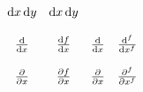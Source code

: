 \documentclass{unittest}
\begin{document}
\(\begin{array}{ccccc}
\\\\%
	\dd{x}\dd{y} & \dd{x}\dd{y}
\\\\%
	\dv{x} & \dv{f}{x} & \dv{}{x} & \dv[f]{x}
\\\\%
	\pdv{x} & \pdv{f}{x} & \pdv{}{x} & \pdv[f]{x}
\\\\%
\end{array}\)
\end{document}
